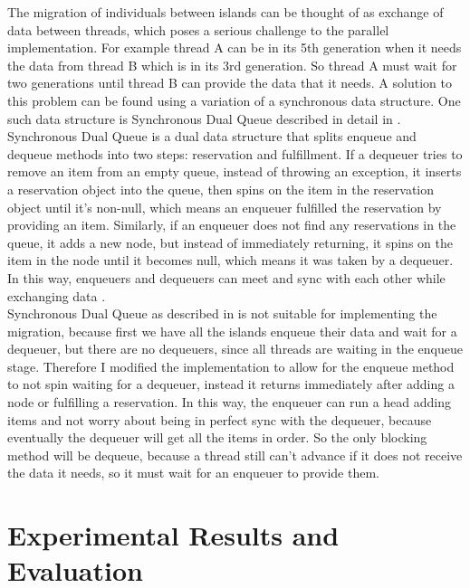 \documentclass[10pt,journal,compsoc]{IEEEtran}
\begin{document}
The migration of individuals between islands can be thought of as exchange of data between threads, which poses a serious challenge to the parallel implementation. For example thread A can be in its 5th generation when it needs the data from thread B which is in its 3rd generation. So thread A must wait for two generations until thread B can provide the data that it needs. A solution to this problem can be found using a variation of a synchronous data structure. One such data structure is Synchronous Dual Queue described in detail in \cite{herlihy2012art}.\\
Synchronous Dual Queue is a dual data structure that splits enqueue and dequeue methods into two steps: reservation and fulfillment. If a dequeuer tries to remove an item from an empty queue, instead of throwing an exception, it inserts a reservation object into the queue, then spins on the item in the reservation object until it’s non-null, which means an enqueuer fulfilled the reservation by providing an item. Similarly, if an enqueuer does not find any reservations in the queue, it adds a new node, but instead of immediately returning, it spins on the item in the node until it becomes null, which means it was taken by a dequeuer. In this way, enqueuers and dequeuers can meet and sync with each other while exchanging data \cite{herlihy2012art}.\\
Synchronous Dual Queue as described in \cite{herlihy2012art} is not suitable for implementing the migration, because first we have all the islands enqueue their data and wait for a dequeuer, but there are no dequeuers, since all threads are waiting in the enqueue stage. Therefore I modified the implementation to allow for the enqueue method to not spin waiting for a dequeuer, instead it returns immediately after adding a node or fulfilling a reservation. In this way, the enqueuer can run a head adding items and not worry about being in perfect sync with the dequeuer, because eventually the dequeuer will get all the items in order. So the only blocking method will be dequeue, because a thread still can’t advance if it does not receive the data it needs, so it must wait for an enqueuer to provide them.

\section{Experimental Results and Evaluation}
\end{document}
